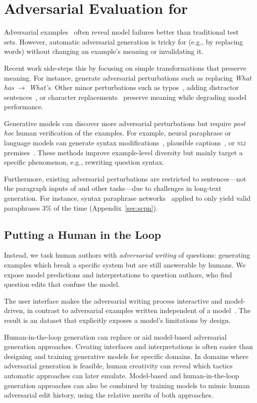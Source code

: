 \section{Adversarial Evaluation for }
\label{sec:recent}

Adversarial examples~\cite{szegedy2013-intriguing} often reveal
model failures better than traditional test sets. However, automatic
adversarial generation is tricky for  (e.g., by replacing words) without
changing an example's meaning or invalidating it.

Recent work side-steps this by focusing on simple
transformations that preserve meaning. For instance,
\citet{ribeiro2018sear} generate adversarial
perturbations such as replacing \emph{What has} $\to$
\emph{What's}. Other minor perturbations such as
typos~\cite{belinkov2018synthetic}, adding distractor
sentences~\cite{jia2017adversarial,mudrakarta2018understand}, or
character replacements~\cite{ebrahimi2017hotflip} preserve meaning
while degrading model performance.

Generative models can discover more adversarial perturbations but
require \textit{post hoc} human verification of the examples.
For example, neural paraphrase or language models can
generate syntax modifications~\cite{iyyerscpn2018}, plausible
captions~\cite{zellers2018swag}, or \textsc{nli}
premises~\cite{zhao2017generating}. These methods improve
example-level diversity but mainly target a specific phenomenon, e.g.,
rewriting question syntax.

Furthermore, existing adversarial perturbations are restricted to sentences---not the
paragraph inputs of \qb{} and other
tasks---due to challenges in long-text generation. For instance,
syntax paraphrase networks~\cite{iyyerscpn2018} applied to \qb{} only
yield valid paraphrases 3\% of the time (Appendix~\ref{sec:scpn}).

\subsection{Putting a Human in the Loop}\label{sec:loop}

Instead, we task human authors with \emph{adversarial writing} of questions:
generating examples which break a specific  system but
are still answerable by humans. We expose model predictions and
interpretations to question authors, who find question edits that confuse the model. 

The user interface makes the adversarial writing process interactive and
model-driven, in contrast to adversarial examples written independent of a model~\cite{ettinger2017towards}. The result is an \challenge{} dataset that explicitly exposes a model's limitations by design.

Human-in-the-loop generation can replace or aid model-based
adversarial generation approaches. Creating
interfaces and interpretations is often easier than designing and
training generative models for specific domains. In domains where
adversarial generation is feasible, human creativity
can reveal which tactics automatic approaches can
later emulate. Model-based and human-in-the-loop generation approaches can
also be combined by training models to mimic human adversarial edit
history, using the relative merits of both approaches.